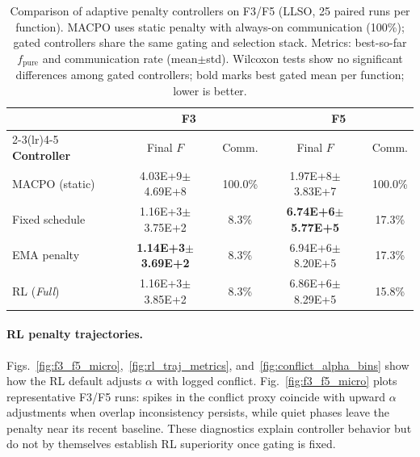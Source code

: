 \documentclass[conference]{IEEEtran}
\begin{document}
\begin{table}[!t]
\centering
\scriptsize
\caption{Comparison of adaptive penalty controllers on F3/F5 (LLSO, 25 paired runs per function). MACPO uses static penalty with always-on communication (100\%); gated controllers share the same gating and selection stack. Metrics: best-so-far $f_{\mathrm{pure}}$ and communication rate (mean$\pm$std). Wilcoxon tests show no significant differences among gated controllers; bold marks best gated mean per function; lower is better.}
\label{tab:penalty_controller_f3_f5}
\setlength{\tabcolsep}{5pt}
\begin{tabular}{@{}lcc|cc@{}}
\toprule
& \multicolumn{2}{c|}{\textbf{F3}} & \multicolumn{2}{c}{\textbf{F5}} \\
\cmidrule(lr){2-3}\cmidrule(lr){4-5}
\textbf{Controller} & Final $F$ & Comm. & Final $F$ & Comm. \\
\midrule
MACPO (static) & 4.03E+9{\scriptsize $\pm$4.69E+8} & 100.0\% & 1.97E+8{\scriptsize $\pm$3.83E+7} & 100.0\% \\
Fixed schedule & 1.16E+3{\scriptsize $\pm$3.75E+2} & 8.3\% & \textbf{6.74E+6{\scriptsize $\pm$5.77E+5}} & 17.3\% \\
EMA penalty & \textbf{1.14E+3{\scriptsize $\pm$3.69E+2}} & 8.3\% & 6.94E+6{\scriptsize $\pm$8.20E+5} & 17.3\% \\
RL (\emph{Full}) & 1.16E+3{\scriptsize $\pm$3.85E+2} & 8.3\% & 6.86E+6{\scriptsize $\pm$8.29E+5} & 15.8\% \\
\bottomrule
\end{tabular}
\end{table}

\paragraph{RL penalty trajectories.}\label{sec:rl_diag_figures} Figs.~\ref{fig:f3_f5_micro},~\ref{fig:rl_traj_metrics}, and~\ref{fig:conflict_alpha_bins} show how the RL default adjusts $\alpha$ with logged conflict. Fig.~\ref{fig:f3_f5_micro} plots representative F3/F5 runs: spikes in the conflict proxy coincide with upward $\alpha$ adjustments when overlap inconsistency persists, while quiet phases leave the penalty near its recent baseline. These diagnostics explain controller behavior but do not by themselves establish RL superiority once gating is fixed.
\end{document}
